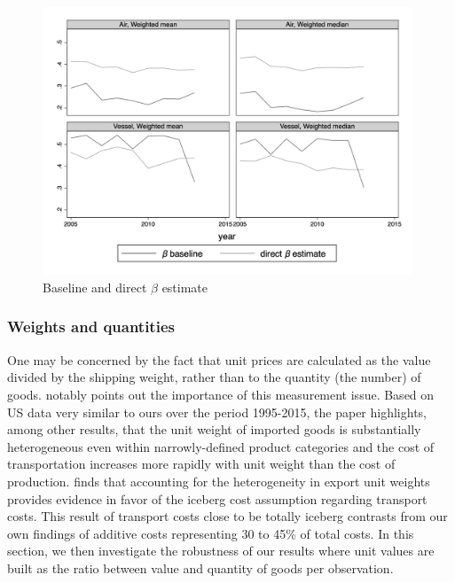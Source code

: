 \documentclass[11pt,twoside, authoryear]{elsarticle}
\begin{document}
\begin{figure}[htbp]
	\caption{Baseline and direct $\beta$ estimate }
\label{fig:beta_comp_direct_estimate}
	\begin{center}
		\includegraphics[height=8cm]
		{../scatter_chronology_baseline_referee1.png}
	\end{center}
\end{figure}


\subsubsection{Weights and quantities}

One may be concerned by the fact that unit prices are calculated as the value divided by the shipping
weight, rather than to the quantity (the number) of goods. \cite{Lashkaripour_JIE2020} notably points out the importance of this measurement issue. Based on US data very similar to ours over the period 1995-2015, the paper highlights, among other results, that the unit weight of imported goods is substantially heterogeneous even within narrowly-defined product categories and the cost of transportation increases more rapidly with unit weight than the cost of production.  \cite{Lashkaripour_JIE2020} finds that accounting for the heterogeneity in export unit weights provides evidence in favor of the iceberg cost assumption regarding transport costs. This result of transport costs close to be totally iceberg contrasts from our own findings of additive costs representing 30 to 45\% of total costs. In this section, we then investigate the robustness of our results where unit values are built as the ratio between value and quantity of goods per observation.
\end{document}
